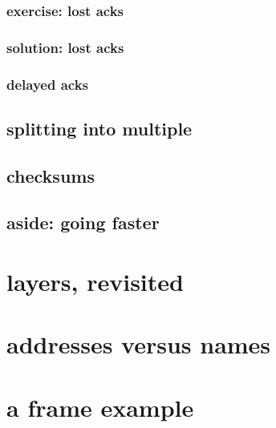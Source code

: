 \subsubsection{exercise: lost acks}

\subsubsection{solution: lost acks}
\iftoggle{heldback}{}{}
\subsubsection{delayed acks}



\subsection{splitting into multiple}



\subsection{checksums}


\subsection{aside: going faster}


\section{layers, revisited}


\section{addresses versus names}



\section{a frame example}


